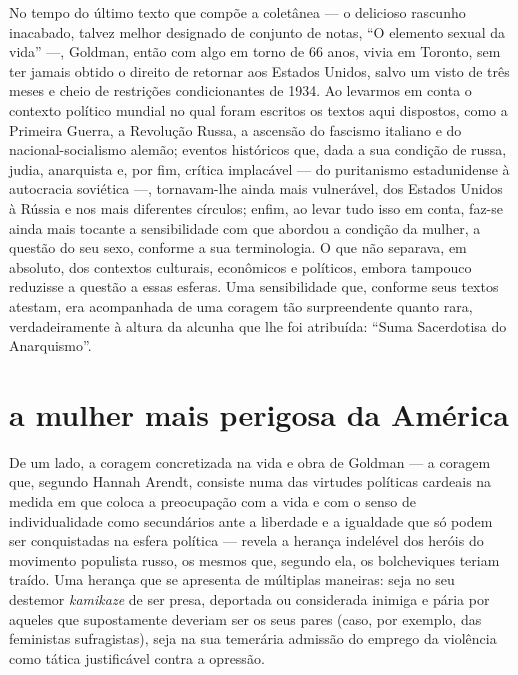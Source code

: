 No tempo do último texto que compõe a coletânea --- o delicioso
rascunho inacabado, talvez melhor designado de conjunto de notas,
``O elemento sexual da vida'' ---, Goldman, então com algo em
torno de 66 anos, vivia em Toronto, sem ter jamais obtido o
direito de retornar aos Estados Unidos, salvo um visto de três meses e
cheio de restrições condicionantes de 1934. Ao levarmos em conta o
contexto político mundial no qual foram escritos os textos aqui dispostos,
como a Primeira Guerra, a Revolução Russa, a ascensão do fascismo
italiano e do nacional-socialismo alemão; eventos históricos
que, dada a sua condição de russa, judia, anarquista e, por
fim, crítica implacável --- do puritanismo estadunidense à autocracia
soviética ---, tornavam-lhe ainda mais vulnerável, dos Estados Unidos
à Rússia e nos mais diferentes círculos; enfim, ao levar tudo isso em
conta, faz-se ainda mais tocante a sensibilidade com que abordou a
condição da mulher, a questão do seu sexo, conforme a sua terminologia.
O que não separava, em absoluto, dos contextos culturais, econômicos e
políticos, embora tampouco reduzisse a questão a essas esferas. Uma
sensibilidade que, conforme seus textos atestam, era acompanhada de
uma coragem tão surpreendente quanto rara, verdadeiramente à altura da
alcunha que lhe foi atribuída: ``Suma Sacerdotisa do Anarquismo''.

\section{a mulher mais perigosa da América}

De um lado, a coragem concretizada na vida e obra de Goldman --- a
coragem que, segundo Hannah Arendt, consiste numa das virtudes políticas
cardeais na medida em que coloca a preocupação com a vida e com o senso
de individualidade como secundários ante a liberdade e a igualdade que
só podem ser conquistadas na esfera política --- revela a herança
indelével dos heróis do movimento populista russo, os mesmos que,
segundo ela, os bolcheviques teriam traído. Uma herança que se apresenta
de múltiplas maneiras: seja no seu destemor
\textit{kamikaze} de ser presa, deportada ou considerada inimiga e pária por
aqueles que supostamente deveriam ser os seus pares (caso, por exemplo,
das feministas sufragistas), seja na sua temerária admissão do emprego
da violência como tática justificável contra a opressão.

